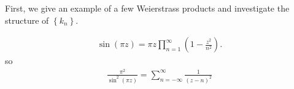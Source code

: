 \documentclass{memoir}
\begin{document}
First, we give an example of a few Weierstrass products and investigate the structure of \(\left\{ k_n \right\} \).

\begin{exmp}
	\begin{align*}
		\sin(\pi z) = \pi z \prod_{n=1}^{\infty} \left( 1- \frac{z^2}{n^2} \right)  .
	\end{align*}
	so
	\begin{align*}
		\frac{\pi ^2}{\sin^2(\pi z)} = \sum_{n=-\infty}^{\infty} \frac{1}{(z-n)^{2}}
	\end{align*}
\end{exmp}


\end{document}
